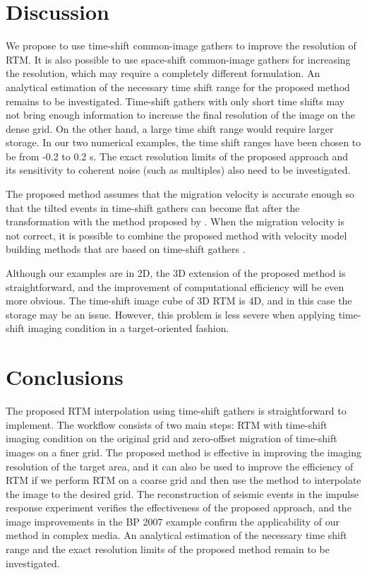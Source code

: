 \section{Discussion}
We propose to use time-shift common-image gathers to improve the resolution of RTM.
It is also possible to use space-shift common-image gathers for increasing the resolution, which may require a completely different formulation.
An analytical estimation of the necessary time shift range for the proposed method remains to be investigated.
Time-shift gathers with only short time shifts may not bring enough information to increase the final resolution of the image on the dense grid.
On the other hand, a large time shift range would require larger storage.
In our two numerical examples, the time shift ranges have been chosen to be from -0.2 to 0.2 s.
The exact resolution limits of the proposed approach and its sensitivity to coherent noise (such as multiples) also need to be investigated.

The proposed method assumes that the migration velocity is accurate enough so that the tilted events in time-shift gathers can become flat after the transformation with the method proposed by \cite{xu14}.
When the migration velocity is not correct, it is possible to combine the proposed method with velocity model building methods that are based on time-shift gathers \cite[]{yang11, luo16}.

Although our examples are in 2D, the 3D extension of the proposed method is straightforward, and the improvement of computational efficiency will be even more obvious.
The time-shift image cube of 3D RTM is 4D, and in this case the storage may be an issue.
However, this problem is less severe when applying time-shift imaging condition in a target-oriented fashion.

\section{Conclusions}
The proposed RTM interpolation using time-shift gathers is straightforward to implement.
The workflow consists of two main steps: RTM with time-shift imaging condition
on the original grid and zero-offset migration of time-shift images on a finer grid.
The proposed method is effective in improving the imaging resolution of the target area, and
it can also be used to improve the efficiency of RTM if we perform RTM on a coarse grid and then use
the method to interpolate the image to the desired grid.
The reconstruction of seismic events in the impulse response experiment verifies the effectiveness of the proposed approach, and the image improvements in the BP 2007 example confirm the applicability of our method in complex media.
An analytical estimation of the necessary time shift range and the exact resolution limits of the proposed method remain to be investigated.


